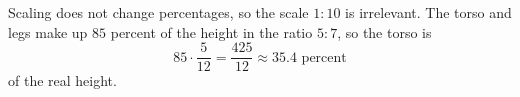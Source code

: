 Scaling does not change percentages, so the scale $1:10$ is irrelevant. The torso and legs make up $85$ percent of the height in the ratio $5:7$, so the torso is
\[
85\cdot\dfrac{5}{12}=\dfrac{425}{12}\approx\boxed{35.4}\text{ percent}
\]
of the real height.
